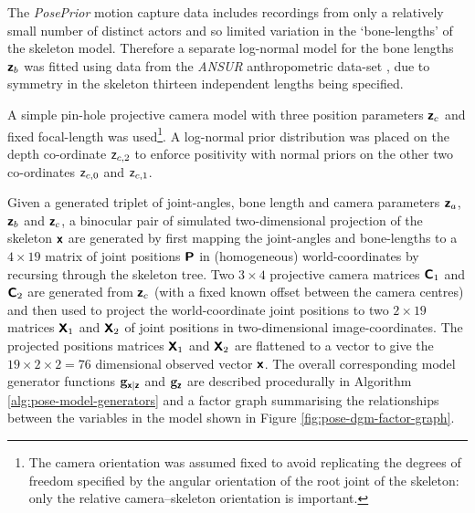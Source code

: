 The \emph{PosePrior} motion capture data includes recordings from only a relatively small number of distinct actors and so limited variation in the `bone-lengths' of the skeleton model. Therefore a separate log-normal model for the bone lengths $\boldsymbol{\mathsf{z}}_b$ was fitted using data from the \emph{ANSUR} anthropometric data-set \citep{gordon1988ansur}, due to symmetry in the skeleton thirteen independent lengths being specified. 

A simple pin-hole projective camera model with three position parameters $\boldsymbol{\mathsf{z}}_c$ and fixed focal-length was used\footnote{The camera orientation was assumed fixed to avoid replicating the degrees of freedom specified by the angular orientation of the root joint of the skeleton: only the relative camera--skeleton orientation is important.}. A log-normal prior distribution was placed on the depth co-ordinate $\mathsf{z}_{c,2}$ to enforce positivity with normal priors on the other two co-ordinates $\mathsf{z}_{c,0}$ and $\mathsf{z}_{c,1}$. 

Given a generated triplet of joint-angles, bone length and camera parameters $\boldsymbol{\mathsf{z}}_a$, $\boldsymbol{\mathsf{z}}_b$ and $\boldsymbol{\mathsf{z}}_c$, a binocular pair of simulated two-dimensional projection of the skeleton $\boldsymbol{\mathsf{x}}$ are generated by first mapping the joint-angles and bone-lengths to a $4 \times 19$ matrix of joint positions $\boldsymbol{\mathsf{P}}$ in (homogeneous) world-coordinates by recursing through the skeleton tree. Two $3 \times 4$ projective camera matrices $\boldsymbol{\mathsf{C}}_1$ and $\boldsymbol{\mathsf{C}}_2$ are generated from $\boldsymbol{\mathsf{z}}_c$ (with a fixed known offset between the camera centres) and then used to project the world-coordinate joint positions to two $2 \times 19$ matrices $\boldsymbol{\mathsf{X}}_1$ and $\boldsymbol{\mathsf{X}}_2$ of joint positions in two-dimensional image-coordinates. The projected positions matrices $\boldsymbol{\mathsf{X}}_1$ and $\boldsymbol{\mathsf{X}}_2$ are flattened to a vector to give the $19 \times 2 \times 2= 76$ dimensional observed vector $\boldsymbol{\mathsf{x}}$. The overall corresponding model generator functions ${\mathbf{g}}_{\boldsymbol{\mathsf{x}}|\boldsymbol{\mathsf{z}}}$ and ${\mathbf{g}}_{\boldsymbol{\mathsf{z}}}$ are described procedurally in Algorithm \ref{alg:pose-model-generators} and a factor graph summarising the relationships between the variables in the model shown in Figure \ref{fig:pose-dgm-factor-graph}.

